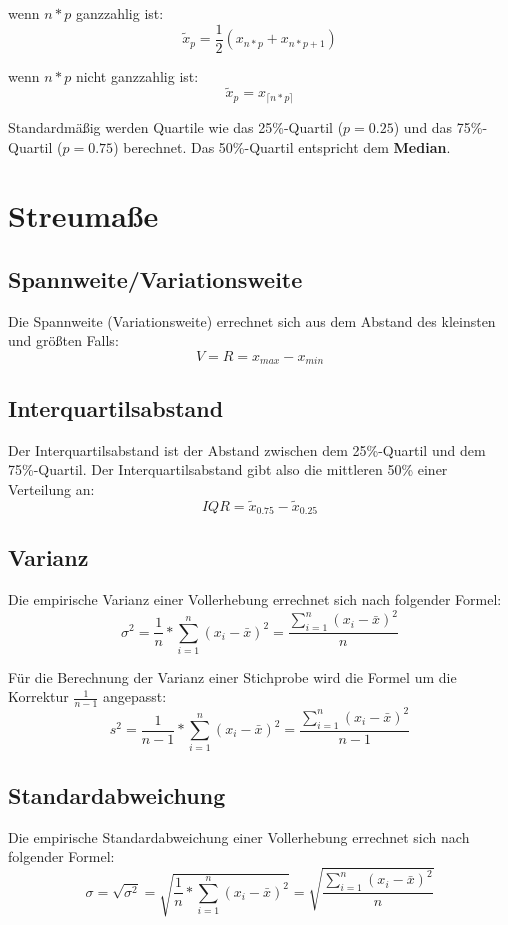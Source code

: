 \documentclass[11pt,a4paper]{article}
\begin{document}
wenn $n*p$ ganzzahlig ist: 
$$\tilde{x}_p = \frac{1}{2}(x_{n*p} + x_{n*p+1})$$
 
wenn $n*p$ nicht ganzzahlig ist:
$$\tilde{x}_p = x_{\lceil n*p \rceil}$$ 

Standardmäßig werden Quartile wie das 25\%-Quartil ($p=0.25$) und das 75\%-Quartil ($p=0.75$) berechnet. Das 50\%-Quartil entspricht dem \textbf{Median}.

\section{Streumaße}
\subsection{Spannweite/Variationsweite}
Die Spannweite (Variationsweite) errechnet sich aus dem Abstand des kleinsten und größten Falls:\\
$$V = R = x_{max} - x_{min}$$

\subsection{Interquartilsabstand}
Der Interquartilsabstand ist der Abstand zwischen dem 25\%-Quartil und dem 75\%-Quartil. Der Interquartilsabstand gibt also die mittleren 50\% einer Verteilung an:\\
$$IQR = \tilde{x}_{0.75} - \tilde{x}_{0.25}$$ 

\subsection{Varianz}
Die empirische Varianz einer Vollerhebung errechnet sich nach folgender Formel: \\
$$\sigma^2=\frac{1}{n} \ast \sum_{i=1}^n(x_i - \bar{x})^2 = \frac{\sum_{i=1}^n(x_i - \bar{x})^2}{n}$$

Für die Berechnung der Varianz einer Stichprobe wird die Formel um die Korrektur $\frac{1}{n-1}$ angepasst: \\
$$s^2=\frac{1}{n-1} \ast \sum_{i=1}^n(x_i - \bar{x})^2 = \frac{\sum_{i=1}^n(x_i - \bar{x})^2}{n-1}$$

\subsection{Standardabweichung}
Die empirische Standardabweichung einer Vollerhebung errechnet sich nach folgender Formel: \\
$$\sigma = \sqrt{\sigma^2} = \sqrt{\frac{1}{n} * \sum_{i=1}^n (x_i - \bar{x})^2} = \sqrt{\frac{\sum_{i=1}^n (x_i - \bar{x})^2}{n}}$$
\end{document}
